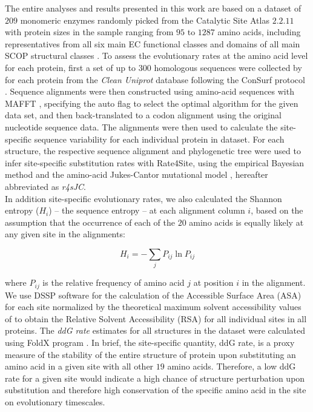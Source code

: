 \documentclass[11pt]{article}
\begin{document}
    The entire analyses and results presented in this work are based on a dataset of $209$ monomeric enzymes \citep[e.g.,][]{yeh_site-specific_2014, echave_relationship_2014} randomly picked from the Catalytic Site Atlas $2.2.11$ \citep[][]{porter_catalytic_2004} with protein sizes in the sample ranging from $95$ to $1287$ amino acids, including representatives from all six main EC functional classes \citep[][]{webb_enzyme_1992} and domains of all main SCOP structural classes \citep[][]{murzin_scop:_1995}. To assess the evolutionary rates at the amino acid level for each protein, first a set of up to $300$ homologous sequences were collected by \citet{yeh_site-specific_2014} for each protein from the {\it Clean Uniprot} database following the ConSurf protocol \citep[][]{goldenberg_consurf-db:_2009, ashkenazy_consurf_2010}. Sequence alignments were then constructed using amino-acid sequences with MAFFT \citep[][]{katoh_mafft_2005}, specifying the auto flag to select the optimal algorithm for the given data set, and then back-translated to a codon alignment using the original nucleotide sequence data. The alignments were then used to calculate the site-specific sequence variability for each individual protein in dataset. For each structure, the respective sequence alignment and phylogenetic tree were used to infer site-specific substitution rates with Rate4Site, using the empirical Bayesian method and the amino-acid Jukes-Cantor mutational model \citep[][]{mayrose_comparison_2004}, hereafter abbreviated as {\it r4sJC}. \\

    In addition site-specific evolutionary rates, we also calculated the Shannon entropy ($H_i$) -- the sequence entropy \citep[][]{shenkin_information-theoretical_1991} -- at each alignment column $i$, based on the assumption that the occurrence of each of the $20$ amino acids is equally likely at any given site in the alignments:

    \begin{equation}
        \label{eqn:shannon}
        H_i = -\sum_j P_{ij}\ln P_{ij}
    \end{equation}

    where $P_{ij}$ is the relative frequency of amino acid $j$ at position $i$ in the alignment. We use DSSP software \citep[][]{kabsch_dictionary_1983} for the calculation of the Accessible Surface Area (ASA) for each site normalized by the theoretical maximum solvent accessibility values of \citet{tien_maximum_2013} to obtain the Relative Solvent Accessibility (RSA) for all individual sites in all proteins. The {\it ddG rate} estimates for all structures in the dataset were calculated using FoldX program \citep[c.f.,][ for details of the methodology employed]{echave_relationship_2014}. In brief, the site-specific quantity, ddG rate, is a proxy measure of the stability of the entire structure of protein upon substituting an amino acid in a given site with all other $19$ amino acids. Therefore, a low ddG rate for a given site would indicate a high chance of structure perturbation upon substitution and therefore high conservation of the specific amino acid in the site on evolutionary timescales. \\
		
\end{document}
